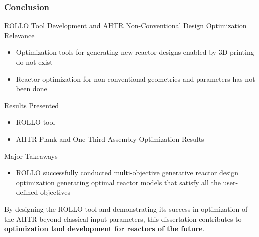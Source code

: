 \begin{frame}
    \frametitle{Conclusion}
    \begin{block}{ROLLO Tool Development and AHTR Non-Conventional Design Optimization}
        Relevance
        \begin{itemize}
            \item Optimization tools for generating new reactor designs enabled by
            3D printing do not exist
            \item Reactor optimization for non-conventional geometries and parameters 
            has not been done 
        \end{itemize}
        Results Presented
        \begin{itemize}
            \item \acrfull{ROLLO} tool 
            \item AHTR Plank and One-Third Assembly Optimization Results 
        \end{itemize}
        Major Takeaways 
        \begin{itemize}
            \item ROLLO successfully conducted multi-objective generative reactor 
            design optimization generating optimal reactor models that satisfy all the 
            user-defined objectives
        \end{itemize}
    \end{block}
    \vspace{-0.1cm}
    By designing the \gls{ROLLO} tool and demonstrating its success in 
    optimization of the \gls{AHTR} beyond classical input parameters, this dissertation 
    contributes to \textbf{optimization tool development for reactors of the future}. 
\end{frame}

